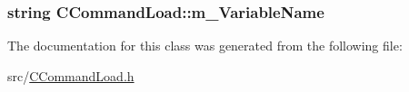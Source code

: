 \subsubsection[{\texorpdfstring{m\+\_\+\+Variable\+Name}{m_VariableName}}]{\setlength{\rightskip}{0pt plus 5cm}string C\+Command\+Load\+::m\+\_\+\+Variable\+Name\hspace{0.3cm}{\ttfamily [private]}}\hypertarget{classCCommandLoad_a0158c8f9882c1a82bba09ccefa67ed12}{}\label{classCCommandLoad_a0158c8f9882c1a82bba09ccefa67ed12}


The documentation for this class was generated from the following file\+:\begin{DoxyCompactItemize}
\item 
src/\hyperlink{CCommandLoad_8h}{C\+Command\+Load.\+h}\end{DoxyCompactItemize}
